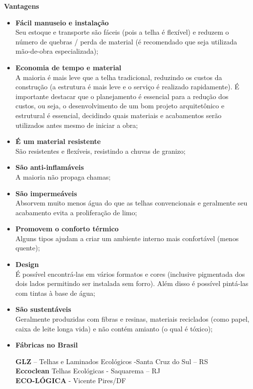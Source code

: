 \textbf{Vantagens}

\begin{itemize}
\item \textbf{Fácil manuseio e instalação}\\Seu estoque e transporte são fáceis (pois a telha é flexível) e reduzem o número de quebras / perda de material (é recomendado que seja utilizada mão-de-obra especializada);

\item \textbf{Economia de tempo e material}\\A maioria é mais leve que a telha 
tradicional, reduzindo os custos da construção (a estrutura é mais leve e o 
serviço é realizado rapidamente). É importante destacar que o planejamento é 
essencial para a redução dos custos, ou seja, o desenvolvimento de um 
bom projeto arquitetônico e estrutural é essencial, decidindo quais materiais
e acabamentos serão utilizados antes mesmo de iniciar a obra;

\item \textbf{É um material resistente}\\São resistentes e flexíveis, resistindo a chuvas de granizo;

\item \textbf{São anti-inflamáveis}\\A maioria não propaga chamas;

\item \textbf{São impermeáveis}\\Absorvem muito menos água do que as telhas convencionais e geralmente seu acabamento evita a proliferação de limo;

\item \textbf{Promovem o conforto térmico}\\Alguns tipos ajudam a criar um ambiente interno mais confortável (menos quente);

\item \textbf{Design}\\É possível encontrá-las em vários formatos e cores (inclusive pigmentada dos dois lados permitindo ser instalada sem forro). Além disso é possível pintá-las com tintas à base de água;

\item \textbf{São sustentáveis}\\Geralmente produzidas com fibras e resinas, materiais reciclados (como papel, caixa de leite longa vida) e não contém amianto (o qual é tóxico);

\item \textbf{Fábricas no Brasil}

\textbf{GLZ} – Telhas e Laminados Ecológicos -Santa Cruz do Sul – RS\\
\textbf{Eccoclean} Telhas Ecológicas - Saquarema – RJ\\
\textbf{ECO-LÓGICA} - Vicente Pires/DF

\end{itemize}

